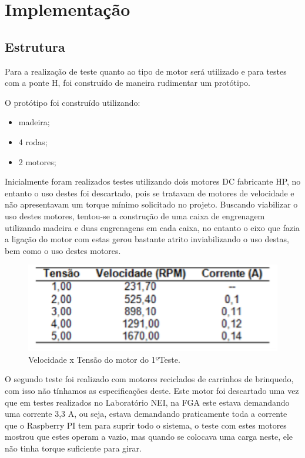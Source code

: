 \chapter[Implementação]{Implementação}

\section{Estrutura}

Para a realização de teste quanto ao tipo de motor será utilizado e para testes com a 
ponte H, foi construído de maneira rudimentar um protótipo.

O protótipo foi construído utilizando:
\begin{itemize}
	\item madeira;
	\item 4 rodas;
	\item 2 motores;
\end{itemize}

Inicialmente foram realizados testes utilizando dois motores DC fabricante HP, no entanto o uso destes foi descartado, pois se
tratavam de motores de velocidade e não apresentavam um torque mínimo solicitado no projeto. Buscando viabilizar o uso destes motores,
tentou-se a construção de uma caixa de engrenagem utilizando madeira e duas engrenagens em cada caixa, no entanto o eixo que fazia a
ligação do motor com estas gerou bastante atrito inviabilizando o uso destas, bem como o uso destes motores.

\begin{figure}[H]
    \centering
    \includegraphics[width=1\textwidth]{figuras/tensao_vel.eps}
    \caption{Velocidade x Tensão do motor do 1ºTeste.}
    \label{fig:tensao_vel}
\end{figure}

O segundo teste foi realizado com motores reciclados de carrinhos de brinquedo, com isso não tínhamos as especificações deste.
Este motor foi descartado uma vez que em testes realizados no Laboratório NEI, na FGA este estava demandando uma corrente 3,3 A,
ou seja, estava demandando praticamente toda a corrente que o Raspberry PI tem para suprir todo o sistema, o teste com estes motores
mostrou que estes operam a vazio, mas quando se colocava uma carga neste, ele não tinha torque suficiente para girar.


